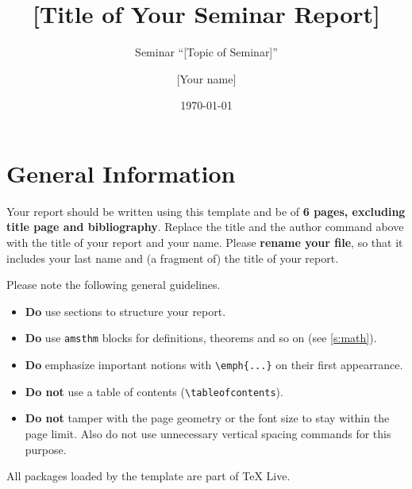 \documentclass[a4paper,11pt,DIV=15]{scrartcl} %
\theoremstyle{plain}
\theoremstyle{definition}
\begin{document}
\subtitle{Seminar ``[Topic of Seminar]''}
\date{\today}
\publishers{RWTH Aachen University}	%

\title{[Title of Your Seminar Report]}

\author{[Your name]}

\maketitle


\begin{abstract}
	\lipsum[1-2]
\end{abstract}

\thispagestyle{empty}

\clearpage


\section{General Information}
Your report should be written using this template and be of \textbf{6 
pages, excluding title page and bibliography}. Replace the title and the author 
command above with the title of your report and your name. Please 
\textbf{rename your file}, so that it includes your last name and (a fragment
of) the title of your report.

Please note the following general guidelines.
\begin{itemize}
	\item \textbf{Do} use sections to structure your report.
	\item \textbf{Do} use \verb|amsthm| blocks for definitions, theorems and so
		on (see \cref{s:math}).
	\item \textbf{Do} emphasize important notions with \verb|\emph{...}| on 
		their first appearrance.
	\item \textbf{Do not} use a table of contents (\verb|\tableofcontents|).
	\item \textbf{Do not} tamper with the page geometry or the font size to stay
		within the page limit. Also do not use unnecessary vertical spacing 
		commands for this purpose.
\end{itemize}

All packages loaded by the template are part of \TeX{} Live.
\end{document}
